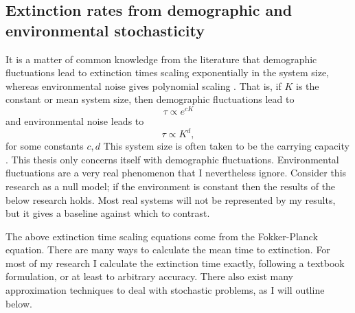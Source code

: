 \documentclass[a4paper,11pt]{article}
\numberwithin{equation}{section} %
\begin{document}
\subsection{Extinction rates from demographic and environmental stochasticity}
It is a matter of common knowledge from the literature that demographic fluctuations lead to extinction times scaling exponentially in the system size, whereas environmental noise gives polynomial scaling \cite{Ovaskainen20X6}. 
That is, if $K$ is the constant or mean system size, then demographic fluctuations lead to
\begin{equation}
\tau \propto e^{cK}
\end{equation}
and environmental noise leads to
\begin{equation}
\tau \propto K^d,
\end{equation}
for some constants $c,d$
This system size is often taken to be the carrying capacity \cite{um...}. 
This thesis only concerns itself with demographic fluctuations. 
Environmental fluctuations are a very real phenomenon that I nevertheless ignore. 
Consider this research as a null model; if the environment is constant then the results of the below research holds. 
Most real systems will not be represented by my results, but it gives a baseline against which to contrast. 

The above extinction time scaling equations come from the Fokker-Planck equation. 
There are many ways to calculate the mean time to extinction. 
For most of my research I calculate the extinction time exactly, following a textbook formulation, or at least to arbitrary accuracy. 
There also exist many approximation techniques to deal with stochastic problems, as I will outline below. 
\end{document}

